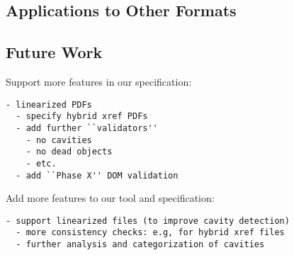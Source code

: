 \subsection{Applications to Other Formats}


\subsection{Future Work}

Support more features in our specification:
\begin{lstlisting}[style=meta]
  - linearized PDFs
  - specify hybrid xref PDFs
  - add further ``validators''
    - no cavities
    - no dead objects
    - etc.
  - add ``Phase X'' DOM validation
\end{lstlisting}

Add more features to our tool and specification:
\begin{lstlisting}[style=meta]
  - support linearized files (to improve cavity detection)
  - more consistency checks: e.g, for hybrid xref files
  - further analysis and categorization of cavities
\end{lstlisting}

